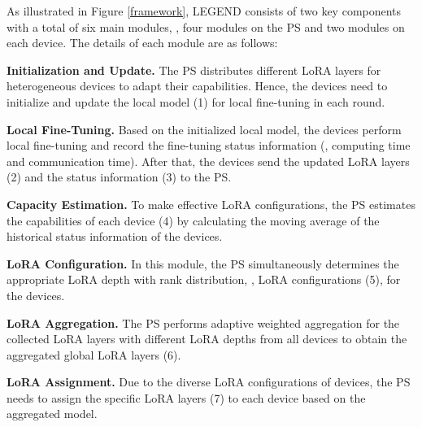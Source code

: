 \vspace{-0.2cm}
As illustrated in Figure \ref{framework}, LEGEND consists of two key components with a total of six main modules, \ie,  four modules on the PS and two modules on each device. 
The details of each module are as follows:

\textbf{Initialization and Update.} 
The PS distributes different LoRA layers for heterogeneous devices to adapt their capabilities.
Hence, the devices need to initialize and update the local model (\normalsize{\textcircled{\scriptsize{1}}}) for local fine-tuning in each round.

\textbf{Local Fine-Tuning.}
Based on the initialized local model, the devices perform local fine-tuning and record the fine-tuning status information (\eg, computing time and communication time).
After that, the devices send the updated LoRA layers (\normalsize{\textcircled{\scriptsize{2}}}) and the status information (\normalsize{\textcircled{\scriptsize{3}}}) to the PS.

\textbf{Capacity Estimation.}
To make effective LoRA configurations, the PS estimates the capabilities of each device (\normalsize{\textcircled{\scriptsize{4}}}) by calculating the moving average of the historical status information of the devices.

\textbf{LoRA Configuration.}
In this module, the PS simultaneously determines the appropriate LoRA depth with rank distribution, \ie, LoRA configurations (\normalsize{\textcircled{\scriptsize{5}}}), for the devices.

\textbf{LoRA Aggregation.}
The PS performs adaptive weighted aggregation for the collected LoRA layers with different LoRA depths from all devices to obtain the aggregated global LoRA layers (\normalsize{\textcircled{\scriptsize{6}}}).


\textbf{LoRA Assignment.}
Due to the diverse LoRA configurations of devices, the PS needs to assign the specific LoRA layers (\normalsize{\textcircled{\scriptsize{7}}}) to each device based on the aggregated model.
\vspace{-0.4cm}


